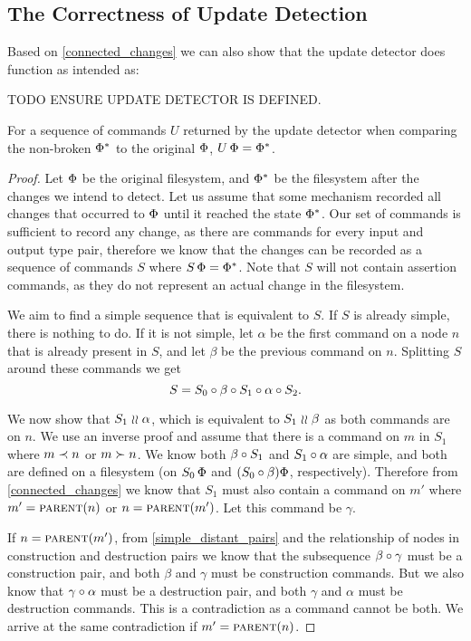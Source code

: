 
\subsection{The Correctness of Update Detection}

Based on \cref{connected_changes} we can also show that
the update detector does function as intended as:

TODO ENSURE UPDATE DETECTOR IS DEFINED.

\begin{myth}
For a sequence of commands $U$ returned by the update detector
when comparing the non-broken $\Phi^*$ to the original $\Phi$,
$U\,\Phi = \Phi^*$.
\end{myth}
\begin{proof}
Let $\Phi$ be the original filesystem, and $\Phi^*$
be the filesystem after the changes we intend to detect.
Let us assume that some mechanism recorded all changes that occurred
to $\Phi$ until it reached the state $\Phi^*$.
Our set of commands is sufficient to record any change, as
there are commands for every input and output type pair, therefore
we know that the changes can be recorded as a sequence of commands $S$
where $S\,\Phi=\Phi^*$.
Note that $S$ will not contain assertion commands, as they do not
represent an actual change in the filesystem.

\newcommand{\ucx}{\alpha}
\newcommand{\ucy}{\beta}
\newcommand{\ucz}{\gamma}

We aim to find a simple sequence that is equivalent to $S$.
If $S$ is already simple, there is nothing to do.
If it is not simple, let $\ucx$ be the first command
on a node $n$ that is already present in $S$,
and let $\ucy$ be the previous command on $n$.
Splitting $S$ around these commands we get
\[ S = S_0 \cc \ucy \cc S_1 \cc \ucx \cc S_2. \]

We now show that $S_1\indep\ucx$,
which is equivalent to $S_1\indep\ucy$ as both commands are on $n$.
We use an inverse proof and assume that there is a command on $m$ in $S_1$
where $m\prec n$ or $m\succ n$.
We know both $\ucy\cc S_1$ and $S_1\cc\ucx$ are simple,
and both are defined on a filesystem
(on $S_0\,\Phi$ and $(S_0\circ\beta)\Phi$, respectively).
Therefore from \cref{connected_changes} we know that
$S_1$ must also contain a command on $m'$ where
$m'=\text{\normalfont\scshape{parent}}(n)$ or $n=\text{\normalfont\scshape{parent}}(m')$.
Let this command be $\ucz$.

If $n=\text{\normalfont\scshape{parent}}(m')$,
from \cref{simple_distant_pairs} 
and the relationship of nodes in construction and destruction pairs
we know that the subsequence
$\ucy\cc\ucz$ must be a construction pair,
and both $\ucy$ and $\ucz$ must be construction commands.
But we also know that $\ucz\cc\ucx$ must be a destruction pair,
and both $\ucz$ and $\ucx$ must be destruction commands.
This is a contradiction as a command cannot be both.
We arrive at the same contradiction if $m'=\text{\normalfont\scshape{parent}}(n)$.


\end{proof}
